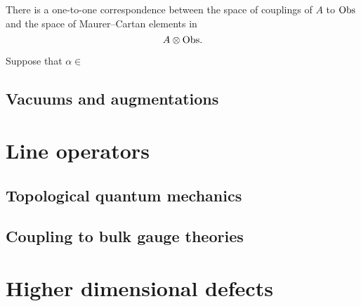 \documentclass[11pt]{amsart}
\begin{document}
\begin{prop}
There is a one-to-one correspondence between the space of couplings of $A$ to ${\rm Obs}$ and the space of Maurer--Cartan elements in 
\[
A \otimes {\rm Obs} .
\]
\end{prop}

Suppose that $\alpha \in $

\subsection{Vacuums and augmentations}


\section{Line operators}


\subsection{Topological quantum mechanics}


\subsection{Coupling to bulk gauge theories}


\section{Higher dimensional defects} 

\end{document}
